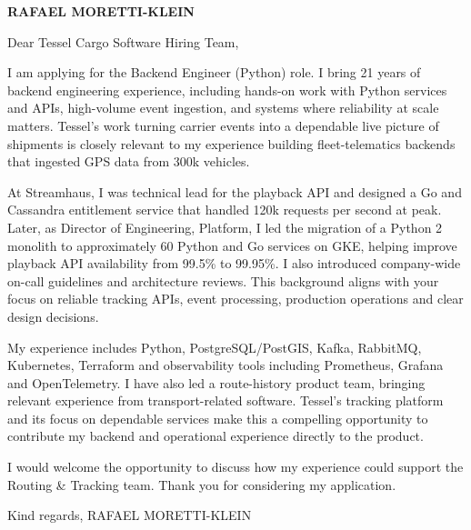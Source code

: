 \documentclass[11pt,a4paper]{article}
\begin{document}
{\Large\bfseries\color{primarycolor} RAFAEL MORETTI-KLEIN}

Dear Tessel Cargo Software Hiring Team,

I am applying for the Backend Engineer (Python) role. I bring 21 years of backend engineering experience, including hands-on work with Python services and APIs, high-volume event ingestion, and systems where reliability at scale matters. Tessel’s work turning carrier events into a dependable live picture of shipments is closely relevant to my experience building fleet-telematics backends that ingested GPS data from 300k vehicles.

At Streamhaus, I was technical lead for the playback API and designed a Go and Cassandra entitlement service that handled 120k requests per second at peak. Later, as Director of Engineering, Platform, I led the migration of a Python 2 monolith to approximately 60 Python and Go services on GKE, helping improve playback API availability from 99.5\% to 99.95\%. I also introduced company-wide on-call guidelines and architecture reviews. This background aligns with your focus on reliable tracking APIs, event processing, production operations and clear design decisions.

My experience includes Python, PostgreSQL/PostGIS, Kafka, RabbitMQ, Kubernetes, Terraform and observability tools including Prometheus, Grafana and OpenTelemetry. I have also led a route-history product team, bringing relevant experience from transport-related software. Tessel’s tracking platform and its focus on dependable services make this a compelling opportunity to contribute my backend and operational experience directly to the product.

I would welcome the opportunity to discuss how my experience could support the Routing & Tracking team. Thank you for considering my application.

Kind regards,
RAFAEL MORETTI-KLEIN
\end{document}
